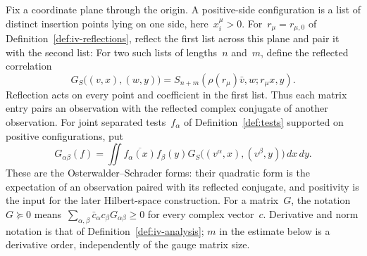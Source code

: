 Fix a coordinate plane through the origin. A positive-side configuration is a list of distinct insertion points lying on one side, here~$x_i^\mu>0$. For~$r_\mu=r_{\mu,0}$ of Definition~\ref{def:iv-reflections}, reflect the first list across this plane and pair it with the second list:
For two such lists of lengths~$n$ and~$m$, define the reflected correlation
\begin{equation}\label{eq:iv-os-form}
 G_S\bigl((v,x),(w,y)\bigr)
 =S_{n+m}(\rho(r_\mu)\bar v,w;r_\mu x,y).
\end{equation}
Reflection acts on every point and coefficient in the first list. Thus each matrix entry pairs an observation with the reflected complex conjugate of another observation.
For joint separated tests~$f_\alpha$ of Definition~\ref{def:tests} supported on positive configurations, put
\begin{equation}\label{eq:iv-os-smear}
 G_{\alpha\beta}(f)
 =\iint\overline{f_\alpha(x)}f_\beta(y)
 G_S\bigl((v^\alpha,x),(v^\beta,y)\bigr)\,dx\,dy.
\end{equation}
These are the Osterwalder--Schrader forms: their quadratic form is the expectation of an observation paired with its reflected conjugate, and positivity is the input for the later Hilbert-space construction.
For a matrix~$G$, the notation~$G\succeq0$ means~$\sum_{\alpha,\beta}\bar c_\alpha c_\beta G_{\alpha\beta}\ge0$ for every complex vector~$c$.
Derivative and norm notation is that of Definition~\ref{def:iv-analysis}; $m$ in the estimate below is a derivative order, independently of the gauge matrix size.


